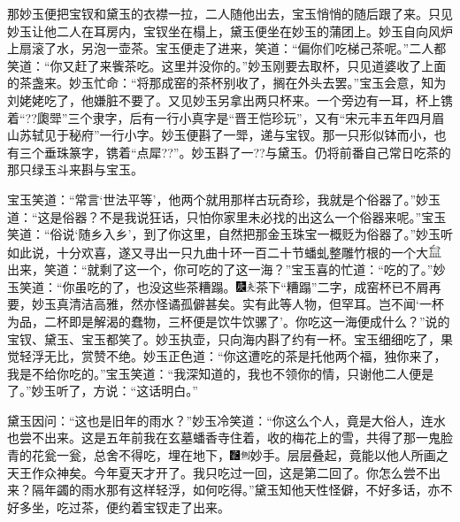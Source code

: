 那妙玉便把宝钗和黛玉的衣襟一拉，二人随他出去，宝玉悄悄的随后跟了来。只见妙玉让他二人在耳房内，宝钗坐在榻上，黛玉便坐在妙玉的蒲团上。妙玉自向风炉上扇滚了水，另泡一壶茶。宝玉便走了进来，笑道：``偏你们吃梯己茶呢。''二人都笑道：``你又赶了来飺茶吃。这里并没你的。''妙玉刚要去取杯，只见道婆收了上面的茶盏来。妙玉忙命：``将那成窑的茶杯别收了，搁在外头去罢。''宝玉会意，知为刘姥姥吃了，他嫌脏不要了。又见妙玉另拿出两只杯来。一个旁边有一耳，杯上镌着``??瓟斝''三个隶字，后有一行小真字是``晋王恺珍玩''，又有``宋元丰五年四月眉山苏轼见于秘府''一行小字。妙玉便斟了一斝，递与宝钗。那一只形似钵而小，也有三个垂珠篆字，镌着``点犀??''。妙玉斟了一??与黛玉。仍将前番自己常日吃茶的那只绿玉斗来斟与宝玉。

宝玉笑道：``常言`世法平等'，他两个就用那样古玩奇珍，我就是个俗器了。''妙玉道：``这是俗器？不是我说狂话，只怕你家里未必找的出这么一个俗器来呢。''宝玉笑道：``俗说`随乡入乡'，到了你这里，自然把那金玉珠宝一概贬为俗器了。''妙玉听如此说，十分欢喜，遂又寻出一只九曲十环一百二十节蟠虬整雕竹根的一个大\includegraphics[width=4mm]{../images/00013}出来，笑道：``就剩了这一个，你可吃的了这一海？''宝玉喜的忙道：``吃的了。''妙玉笑道：``你虽吃的了，也没这些茶糟蹋。{\includegraphics[width=3mm]{../Images/00004}\includegraphics[width=3mm]{../Images/00012}\footnotesize \kaishu 茶下``糟蹋''二字，成窑杯已不屑再要，妙玉真清洁高雅，然亦怪谲孤僻甚矣。实有此等人物，但罕耳。}岂不闻`一杯为品，二杯即是解渴的蠢物，三杯便是饮牛饮骡了'。你吃这一海便成什么？''说的宝钗、黛玉、宝玉都笑了。妙玉执壶，只向海内斟了约有一杯。宝玉细细吃了，果觉轻浮无比，赏赞不绝。妙玉正色道：``你这遭吃的茶是托他两个福，独你来了，我是不给你吃的。''宝玉笑道：``我深知道的，我也不领你的情，只谢他二人便是了。''妙玉听了，方说：``这话明白。''

黛玉因问：``这也是旧年的雨水？''妙玉冷笑道：``你这么个人，竟是大俗人，连水也尝不出来。这是五年前我在玄墓蟠香寺住着，收的梅花上的雪，共得了那一鬼脸青的花瓮一瓮，总舍不得吃，埋在地下，{\includegraphics[width=3mm]{../Images/00006}\includegraphics[width=3mm]{../Images/00011}\footnotesize \kaishu 妙手。层层叠起，竟能以他人所画之天王作众神矣。}今年夏天才开了。我只吃过一回，这是第二回了。你怎么尝不出来？隔年蠲的雨水那有这样轻浮，如何吃得。''黛玉知他天性怪僻，不好多话，亦不好多坐，吃过茶，便约着宝钗走了出来。

